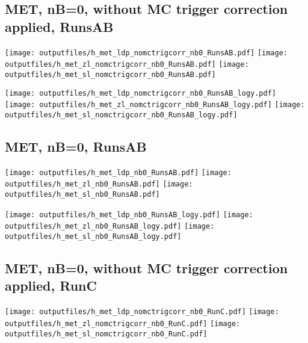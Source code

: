 \documentclass[11pt]{article}
\begin{document}
    \subsection{ MET, nB=0, without MC trigger correction applied, RunsAB}

    \noindent
    \texttt{[image: outputfiles/h\_met\_ldp\_nomctrigcorr\_nb0\_RunsAB.pdf]}
    \texttt{[image: outputfiles/h\_met\_zl\_nomctrigcorr\_nb0\_RunsAB.pdf]}
    \texttt{[image: outputfiles/h\_met\_sl\_nomctrigcorr\_nb0\_RunsAB.pdf]}

    \noindent
    \texttt{[image: outputfiles/h\_met\_ldp\_nomctrigcorr\_nb0\_RunsAB\_logy.pdf]}
    \texttt{[image: outputfiles/h\_met\_zl\_nomctrigcorr\_nb0\_RunsAB\_logy.pdf]}
    \texttt{[image: outputfiles/h\_met\_sl\_nomctrigcorr\_nb0\_RunsAB\_logy.pdf]}


    \subsection{ MET, nB=0, RunsAB}

    \noindent
    \texttt{[image: outputfiles/h\_met\_ldp\_nb0\_RunsAB.pdf]}
    \texttt{[image: outputfiles/h\_met\_zl\_nb0\_RunsAB.pdf]}
    \texttt{[image: outputfiles/h\_met\_sl\_nb0\_RunsAB.pdf]}

    \noindent
    \texttt{[image: outputfiles/h\_met\_ldp\_nb0\_RunsAB\_logy.pdf]}
    \texttt{[image: outputfiles/h\_met\_zl\_nb0\_RunsAB\_logy.pdf]}
    \texttt{[image: outputfiles/h\_met\_sl\_nb0\_RunsAB\_logy.pdf]}




    \subsection{ MET, nB=0, without MC trigger correction applied, RunC}

    \noindent
    \texttt{[image: outputfiles/h\_met\_ldp\_nomctrigcorr\_nb0\_RunC.pdf]}
    \texttt{[image: outputfiles/h\_met\_zl\_nomctrigcorr\_nb0\_RunC.pdf]}
    \texttt{[image: outputfiles/h\_met\_sl\_nomctrigcorr\_nb0\_RunC.pdf]}
\end{document}
